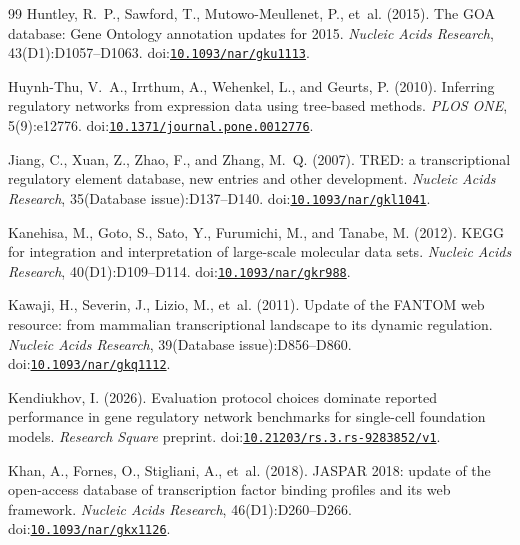\begin{thebibliography}{99}
Huntley, R.~P., Sawford, T., Mutowo-Meullenet, P., et~al. (2015).
\newblock The GOA database: Gene Ontology annotation updates for 2015.
\newblock \emph{Nucleic Acids Research}, 43(D1):D1057--D1063.
\newblock doi:\href{https://doi.org/10.1093/nar/gku1113}{\nolinkurl{10.1093/nar/gku1113}}.

Huynh-Thu, V.~A., Irrthum, A., Wehenkel, L., and Geurts, P. (2010).
\newblock Inferring regulatory networks from expression data using tree-based methods.
\newblock \emph{PLOS ONE}, 5(9):e12776.
\newblock doi:\href{https://doi.org/10.1371/journal.pone.0012776}{\nolinkurl{10.1371/journal.pone.0012776}}.

Jiang, C., Xuan, Z., Zhao, F., and Zhang, M.~Q. (2007).
\newblock TRED: a transcriptional regulatory element database, new entries and other development.
\newblock \emph{Nucleic Acids Research}, 35(Database issue):D137--D140.
\newblock doi:\href{https://doi.org/10.1093/nar/gkl1041}{\nolinkurl{10.1093/nar/gkl1041}}.

Kanehisa, M., Goto, S., Sato, Y., Furumichi, M., and Tanabe, M. (2012).
\newblock KEGG for integration and interpretation of large-scale molecular data sets.
\newblock \emph{Nucleic Acids Research}, 40(D1):D109--D114.
\newblock doi:\href{https://doi.org/10.1093/nar/gkr988}{\nolinkurl{10.1093/nar/gkr988}}.

Kawaji, H., Severin, J., Lizio, M., et~al. (2011).
\newblock Update of the FANTOM web resource: from mammalian transcriptional landscape to its dynamic regulation.
\newblock \emph{Nucleic Acids Research}, 39(Database issue):D856--D860.
\newblock doi:\href{https://doi.org/10.1093/nar/gkq1112}{\nolinkurl{10.1093/nar/gkq1112}}.

Kendiukhov, I. (2026).
\newblock Evaluation protocol choices dominate reported performance in gene regulatory network benchmarks for single-cell foundation models.
\newblock \emph{Research Square} preprint.
\newblock doi:\href{https://doi.org/10.21203/rs.3.rs-9283852/v1}{\nolinkurl{10.21203/rs.3.rs-9283852/v1}}.

Khan, A., Fornes, O., Stigliani, A., et~al. (2018).
\newblock JASPAR 2018: update of the open-access database of transcription factor binding profiles and its web framework.
\newblock \emph{Nucleic Acids Research}, 46(D1):D260--D266.
\newblock doi:\href{https://doi.org/10.1093/nar/gkx1126}{\nolinkurl{10.1093/nar/gkx1126}}.


\end{thebibliography}
